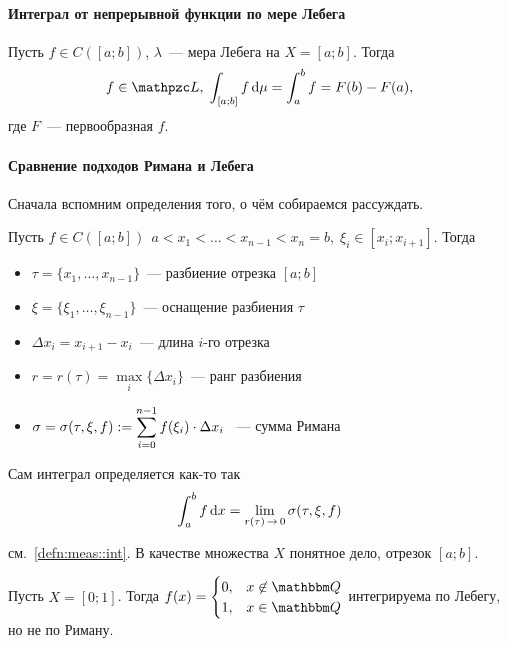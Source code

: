 \documentclass[draft, timbord]{longnotes}
\begin{document}
\paragraph{Интеграл от непрерывной функции по мере Лебега}
\label{par:meas::contint}

\begin{thrm}\label{thrm:meas::contint}
  Пусть $f \in C([a;b])$, $\lambda$~--- мера Лебега на $X = [a;b]$. Тогда
  \[
    f \in \summb , \; \int_{[a;b]} f \, \del \mu = \int_a ^b f = F(b) - F(a),
  \]
  где $F$~--- первообразная $f$.
\end{thrm}

\paragraph{Сравнение подходов Римана и Лебега}
\label{par:meas::rimleb}

Сначала вспомним определения того, о чём собираемся рассуждать.

\begin{defn}\label{defn:meas::rimleb::rim}
  Пусть $f\in C([a;b])\,\; a < x_1 < \dots < x_{n-1} < x_n = b,\; 
  \xi_i\in[x_i;x_{i+1}]$. Тогда 
    \begin{itemize}
      \item $\tau = \{x_1,\dots,x_{n-1}\}$~--- разбиение отрезка $[a;b]$
      \item $\xi = \{\xi_1,\dots,\xi_{n-1}\}$~--- оснащение разбиения $\tau$
      \item $\Delta x_i = x_{i+1}-x_i$~--- длина $i$-го отрезка
      \item $r=r(\tau) = \max\limits_i\{\Delta x_i\}$~--- ранг разбиения
      \item $\sigma = \sigma(\tau,\xi,f):= \displaystyle\sum\limits_{i=0}^{n-1}f(\xi_i)\cdot\Delta x_i$ ~---
        сумма Римана
    \end{itemize}
    Сам интеграл определяется как-то так 
    \[
      \int_a^b f \, \del x = \lim_{r(\tau)\to 0} \sigma(\tau,\xi,f)
    \]
\end{defn}

\begin{defn}\label{defn:meas::rimleb::leb}
  см.~\ref{defn:meas::int}. В качестве множества $X$ понятное дело, отрезок $[a;b]$.
\end{defn}

\begin{exmp}\label{exmp:meas::rimleb::notrim}
  Пусть $X=[0;1]$. Тогда $f(x) = \begin{cases}
    0, & x\not\in \Q \\
    1, & x\in \Q 
  \end{cases}$ интегрируема по Лебегу, но не по Риману.
\end{exmp}
\end{document}
